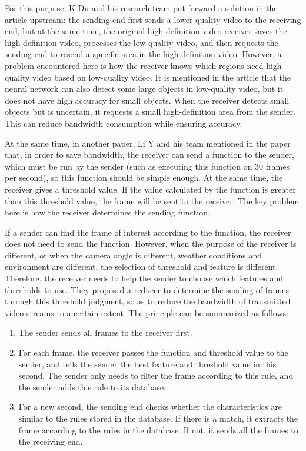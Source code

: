 \documentclass[conference]{IEEEtran}
\begin{document}
For this purpose, K Du and his research team put forward a solution in the article  upstream\cite{a2}: the sending end first sends a lower quality video to the receiving end, but at the same time, the original high-definition video receiver saves the high-definition video, processes the low quality video, and then requests the sending end to resend a specific area in the high-definition video. However, a problem encountered here is how the receiver knows which regions need high-quality video based on low-quality video. It is mentioned in the article that the neural network can also detect some large objects in low-quality video, but it does not have high accuracy for small objects. When the receiver detects small objects but is uncertain, it requests a small high-definition area from the sender. This can reduce bandwidth consumption while ensuring accuracy.

At the same time, in another paper, Li Y and his team mentioned in the paper\cite{a3} that, in order to save bandwidth, the receiver can send a function to the sender, which must be run by the sender (such as executing this function on 30 frames per second), so this function should be simple enough. At the same time, the receiver gives a threshold value. If the value calculated by the function is greater than this threshold value, the frame will be sent to the receiver. The key problem here is how the receiver determines the sending function.

If a sender can find the frame of interest according to the function, the receiver does not need to send the function. However, when the purpose of the receiver is different, or when the camera angle is different, weather conditions and environment are different, the selection of threshold and feature is different. Therefore, the receiver needs to help the sender to choose which features and thresholds to use. They proposed a reducer to determine the sending of frames through this threshold judgment, so as to reduce the bandwidth of transmitted video streams to a certain extent. The principle can be summarized as follows:

\begin{enumerate}
    \item The sender sends all frames to the receiver first.
    
    \item For each frame, the receiver passes the function and threshold value to the sender, and tells the sender the best feature and threshold value in this second. The sender only needs to filter the frame according to this rule, and the sender adds this rule to its database;
    
    \item For a new second, the sending end checks whether the characteristics are similar to the rules stored in the database. If there is a match, it extracts the frame according to the rules in the database. If not, it sends all the frames to the receiving end.
\end{enumerate}
\end{document}
